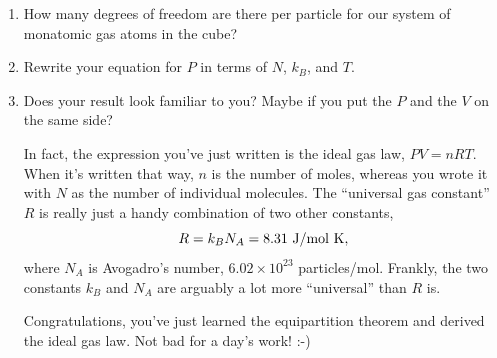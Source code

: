 \begin{enumerate}[labparts]
\item How many degrees of freedom are there per particle for our system of monatomic gas atoms in the cube?
\answerspace{0.5in}

\item Rewrite your equation for $P$ in terms of $N$, $k_B$, and $T$.  
\answerspace{0.6in}


\item Does your result look familiar to you?  Maybe if you put the $P$ and the $V$ on the same side?
\answerspace{0.6in}

\pagebreak[3]

In fact, the expression you've just written is the ideal gas law, $PV = nRT$.  When it's written that way, $n$ is the number of moles, whereas you wrote it with $N$ as the number of individual molecules.  The ``universal gas constant'' $R$ is really just a handy combination of two other constants, 
$$R =k_BN_A=8.31~{\rm J/mol ~K,}$$
where $N_A$ is Avogadro's number, $6.02 \times 10^{23}$ particles/mol. Frankly, the two constants $k_B$ and $N_A$ are arguably a lot more ``universal'' than $R$ is. 

\medskip

Congratulations, you've just learned the equipartition theorem and derived the ideal gas law.  Not bad for a day's work! :-)

\end{enumerate}